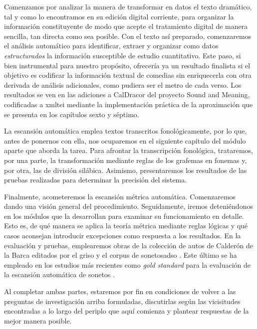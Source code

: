 Comenzamos por analizar la manera de transformar en datos el texto dramático, tal y como lo encontramos en su edición digital corriente, para organizar la información constituyente de modo que acepte el tratamiento digital de manera sencilla, tan directa como sea posible. Con el texto así preparado, comenzaremos el análisis automático para identificar, extraer y organizar como datos \textit{estructurados} la información susceptible de estudio cuantitativo. Este paso, si bien instrumental para nuestro propósito, ofrecería ya un resultado finalista si el objetivo es codificar la información textual de comedias sin enriquecerla con otra derivada de análisis adicionales, como pudiera ser el metro de cada verso. Los resultados se ven en las adiciones a CalDracor del proyecto Sound and Meaning, codificadas a \ac{xmltei} mediante la implementación práctica de la aproximación que se presenta en los capítulos sexto y séptimo.  

La escansión automática emplea textos transcritos fonológicamente, por lo que, antes de ponernos con ella, nos ocuparemos en el siguiente capítulo del módulo aparte que aborda la tarea. Para afrontar la transcripción fonológica, trataremos, por una parte, la transformación mediante reglas de los grafemas en fonemas y, por otra, las de división silábica.  Asimismo, presentaremos los resultados de las pruebas realizadas para determinar la precisión del sistema.

Finalmente, acometeremos la escansión métrica automática. Comenzaremos dando una visión general del procedimiento. Seguidamente, iremos deteniéndonos en los módulos que la desarrollan para examinar su funcionamiento en detalle. Esto es, de qué manera se aplica la teoría métrica mediante reglas lógicas y qué casos aconsejan introducir excepciones como respuesta a los resultados. En la evaluación y pruebas, emplearemos obras de la colección de autos de Calderón de la Barca editados por el \ac{griso} \parencite*{griso2020} y el corpus de sonetos\ac{adso} \parencite{navarrocolorado2016b}. Este último se ha empleado en los estudios más recientes como \textit{gold standard} para la evaluación de la escansión automática de sonetos \parencite[51735]{marco2021}.

Al completar ambas partes, estaremos por fin en condiciones de volver a las preguntas de investigación arriba formuladas, discutirlas según las vicisitudes encontradas a lo largo del periplo que aquí comienza y plantear respuestas de la mejor manera posible.

